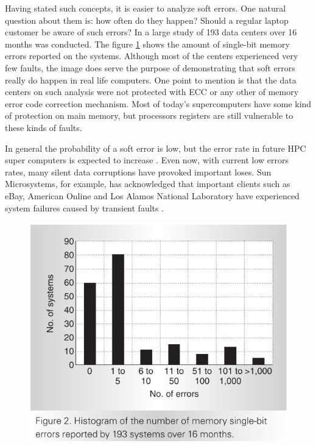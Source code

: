 Having stated such concepts, it is easier to analyze soft errors. One natural question about them is: how often do they happen? Should a regular laptop customer be aware of such errors? In \cite{constantinescu2003trends} a large study of 193 data centers over 16 months was conducted. The figure \ref{fig:Soft-Error-Histogram} shows the amount of single-bit memory errors reported on the systems. Although most of the centers experienced very few faults, the image does serve the purpose of demonstrating that soft errors really do happen in real life computers. One point to mention is that the data centers on such analysis were not protected with ECC or any other of memory error code correction mechanism. Most of today's supercomputers have some kind of protection on main memory, but processors registers are still vulnerable to these kinds of faults. 

In general the probability of a soft error is low, but the error rate in future HPC super computers is expected to increase \cite{calhoun2017towards}. Even now, with current low errors rates, many silent data corruptions have provoked important loses. Sun Microsystems, for example, has acknowledged that important clients such as eBay, American Online and Los Alamos National Laboratory have experienced system failures caused by transient faults \cite{michalak2005predicting}. 

\begin{figure}[h]
	\centering
	\includegraphics[height=0.35\textheight]{images/Soft-Errors-Histogram.png}
	\label{fig:Soft-Error-Histogram}
\end{figure}

